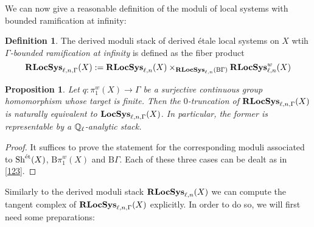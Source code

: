 \documentclass[10pt,a4paper]{amsart}
\numberwithin{equation}{subsection}
\theoremstyle{plain}
\newtheorem{prop}[theorem]{Proposition}
\theoremstyle{definition}
\newtheorem{defi}[theorem]{Definition}
\theoremstyle{remark}
\numberwithin{equation}{section}
\begin{document}
We can now give a reasonable definition of the moduli of local systems with bounded ramification at infinity:

\begin{defi}
The derived moduli stack of derived \'etale local systems on $X$ wtih \emph{$\Gamma$-bounded ramification at infinity} is defined as the fiber product
	\[
		\mathbf R \mathbf{LocSys}_{\ell, n, \Gamma} (X) : =  \mathbf R \mathbf{LocSys}_{\ell, n}(X) \times_{ 	 \mathbf R \mathbf{LocSys}_{\ell, n}( \mathrm B \Gamma 	) 	}  	\mathbf R \mathbf{LocSys}_{\ell, n}^w (X)
	\]
\end{defi}

\begin{prop}
Let $q \colon \pi_1^w(X) \to \Gamma$ be a surjective continuous group homomorphism whose target is finite. Then the $0$-truncation of $\mathbf R \mathbf{LocSys}_{\ell, n, \Gamma}(X) $ is naturally equivalent to $\mathbf{LocSys}_{\ell, n, \Gamma}(X) $. In particular, the former is representable by a
$\mathbb{Q}_{\ell}$-analytic stack.
\end{prop}

\begin{proof}
It suffices to prove the statement for the corresponding moduli associated to $\mathrm{Sh}^{\text{\'et}}(X)$, $\mathrm B \pi_1^w(X)$ and $\mathrm B \Gamma$. Each of these three cases can be dealt as in \cref{123}.
\end{proof}

Similarly to the derived moduli stack $\mathbf R \mathbf{LocSys}_{\ell, n}(X)$ we can compute the tangent complex of $\mathbf R \mathbf{LocSys}_{\ell, n, \Gamma}(X)$ explicitly. In order to do so, we will first need some preparations:
\end{document}
